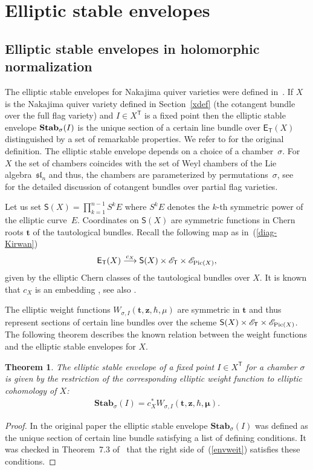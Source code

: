 \documentclass[10pt,a4paper]{amsart}
\newcommand{\bT}{\mathsf{T}}
\newcommand{\cE}{\mathscr{E}}
\def\ttt{{\boldsymbol t}}
\def\zz{{\boldsymbol z}}
\def\mub{{\boldsymbol\mu}}
\numberwithin{equation}{section}
\newtheorem{Theorem}{Theorem}[section]
\begin{document}
\section{Elliptic stable envelopes \label{envelsection}}
\subsection{Elliptic stable envelopes in holomorphic normalization}
The elliptic stable envelopes for Nakajima quiver varieties were defined in~\cite{AOelliptic}. If $X$ is the Nakajima quiver variety defined in Section~\ref{xdef} (the cotangent bundle over the full flag variety) and $I\in X^{\bT}$ is a fixed point then the elliptic stable envelope ${\bf Stab}_{\sigma}(I)$ is the unique section of a certain line bundle over $\textsf{E}_{\bT}(X)$ distinguished by a set of remarkable properties. We refer to \cite[Section~3]{AOelliptic} for the original definition. The elliptic stable envelope depends on a choice of a chamber~$\sigma$. For~$X$ the set of chambers coincides with the set of Weyl chambers of the Lie algebra~$\mathfrak{sl}_{n}$ and thus, the chambers are parameterized by permutations~$\sigma$, see~\cite{Rim} for the detailed discussion of cotangent bundles over partial flag varieties.

Let us set $\mathsf{S}(X)=\prod\limits_{k=1}^{n-1} S^k E$ where $S^k E$ denotes the $k$-th symmetric power of the elliptic curve~$E$. Coordinates on $\mathsf{S}(X)$ are symmetric functions in Chern roots $\ttt$ of the tautological bundles. Recall the following map as in~(\ref{diag-Kirwan})
\begin{gather*}
\textsf{E}_{\bT}(X) \stackrel{c_{X}}{\longrightarrow} \mathsf{S}(X)\times \cE_{\bT} \times \cE_{{\rm Pic}(X)},
\end{gather*}
given by the elliptic Chern classes of the tautological bundles over $X$. It is known that $c_{X}$ is an embedding \cite{McGN}, see also \cite[Section~2.4]{AOelliptic}.

The elliptic weight functions $W_{\sigma, I}(\ttt,\zz,\hbar,\mu)$ are symmetric in $\ttt$ and thus represent sections of certain line bundles over the scheme $\mathsf{S}(X)\times \cE_{\bT} \times \cE_{{\rm Pic}(X)}$. The following theorem describes the known relation between the weight functions and the elliptic stable envelopes for $X$.
\begin{Theorem}The elliptic stable envelope of a fixed point $I\in X^{\bT}$ for a chamber $\sigma$ is given by the restriction of the corresponding elliptic weight function to elliptic cohomology of $X$:
\begin{gather} \label{envweit}
\textbf{Stab}_{\sigma}(I)=c_{X}^{*}W_{\sigma, I}(\ttt,\zz,\hbar,\mub).
\end{gather}
\end{Theorem}
\begin{proof}In the original paper \cite{AOelliptic} the elliptic stable envelope $\textbf{Stab}_{\sigma}(I)$ was defined as the unique section of certain line bundle satisfying a list of defining conditions. It was checked in Theorem~7.3 of~\cite{RTV} that the right side of~(\ref{envweit}) satisfies these conditions.
\end{proof}
\end{document}
